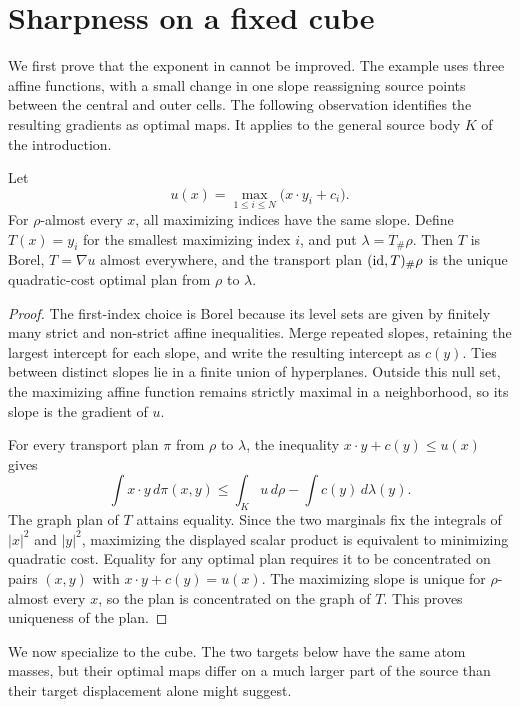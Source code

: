 \section{Sharpness on a fixed cube}
\label{sec:sharpness}

We first prove that the exponent in  cannot be
improved. The example uses three affine functions, with a small change
in one slope reassigning source points between the central and outer
cells. The following observation identifies the resulting gradients as
optimal maps. It applies to the general source body $K$ of the introduction.

\begin{lemma}
\label{cells:optimality}
Let
\[
 u(x)=\max_{1\le i\le N}\bigl(x\cdot y_i+c_i\bigr).
\]
For $\rho$-almost every $x$, all maximizing indices have the same slope.
Define $T(x)=y_i$ for the smallest maximizing index $i$, and put
$\lambda=T_\#\rho$. Then $T$ is Borel, $T=\nabla u$ almost everywhere, and
the transport plan $(\mathrm{id},T)_\#\rho$ is the unique quadratic-cost optimal
plan from $\rho$ to $\lambda$.
\end{lemma}

\begin{proof}
The first-index choice is Borel because its level sets are given by
finitely many strict and non-strict affine inequalities.
Merge repeated slopes, retaining the largest intercept for each slope, and
write the resulting intercept as $c(y)$. Ties between distinct slopes lie
in a finite union of hyperplanes. Outside this null set, the maximizing
affine function remains strictly maximal in a neighborhood, so its slope
is the gradient of $u$.

For every transport plan $\pi$ from $\rho$ to $\lambda$, the inequality
$x\cdot y+c(y)\le u(x)$ gives
\[
 \int x\cdot y\,d\pi(x,y)
 \le \int_K u\,d\rho-\int c(y)\,d\lambda(y).
\]
The graph plan of $T$ attains equality. Since the two marginals fix the
integrals of $|x|^2$ and $|y|^2$, maximizing the displayed scalar product is
equivalent to minimizing quadratic cost. Equality for any optimal plan
requires it to be concentrated on pairs $(x,y)$ with
$x\cdot y+c(y)=u(x)$. The maximizing slope is unique for $\rho$-almost every
$x$, so the plan is concentrated on the graph of $T$. This proves
uniqueness of the plan.
\end{proof}

We now specialize to the cube. The two targets below have the same atom
masses, but their optimal maps differ on a much larger part of the source
than their target displacement alone might suggest.

